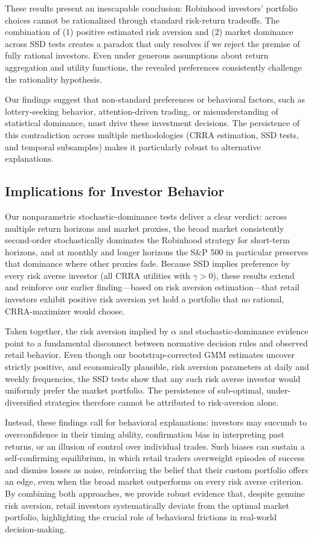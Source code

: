 These results present an inescapable conclusion: Robinhood investors' portfolio choices cannot be rationalized through standard risk-return tradeoffs. 
The combination of (1) positive estimated risk aversion and (2) market dominance across SSD tests creates a paradox that only resolves if we reject the premise of fully rational investors.
Even under generous assumptions about return aggregation and utility functions, the revealed preferences consistently challenge the rationality hypothesis.

Our findings suggest that non-standard preferences or behavioral factors, such as lottery-seeking behavior, attention-driven trading, or misunderstanding of statistical dominance, must drive these investment decisions. 
The persistence of this contradiction across multiple methodologies (CRRA estimation, SSD tests, and temporal subsamples) makes it particularly robust to alternative explanations.


\subsection{Implications for Investor Behavior}

Our nonparametric stochastic-dominance tests deliver a clear verdict: across multiple return horizons and market proxies, the broad market consistently second-order stochastically dominates the Robinhood strategy for short-term horizons, and at monthly and longer horizons the S\&P 500  in particular preserves that dominance where other proxies fade.  
Because SSD implies preference by every risk averse investor (all CRRA utilities with $\gamma>0$), these results extend and reinforce our earlier finding—based on risk aversion estimation—that retail investors exhibit positive risk aversion yet hold a portfolio that no rational, CRRA-maximizer would choose.  

Taken together, the risk aversion implied by $\alpha$ and stochastic-dominance evidence point to a fundamental disconnect between normative decision rules and observed retail behavior.  
Even though our bootstrap-corrected GMM estimates uncover strictly positive, and economically plausible, risk aversion parameters at daily and weekly frequencies, 
the SSD tests show that any such risk averse investor would uniformly prefer the market portfolio.  
The persistence of sub-optimal, under-diversified strategies therefore cannot be attributed to risk-aversion alone.

Instead, these findings call for behavioral explanations: investors may succumb to overconfidence in their timing ability, confirmation bias in interpreting past returns, or an illusion of control over individual trades.  
Such biases can sustain a self-confirming equilibrium, in which retail traders overweight episodes of success and dismiss losses as noise, reinforcing the belief that their custom portfolio offers an edge, even when the broad market outperforms on every risk averse criterion.
By combining both approaches, we provide robust evidence that, despite genuine risk aversion, retail investors systematically deviate from the optimal market portfolio, highlighting the crucial role of behavioral frictions in real-world decision-making.  
